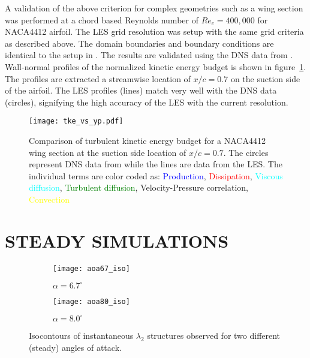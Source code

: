 \documentclass[twocolumn,10pt]{tsfp}
\begin{document}
A validation of the above criterion for complex geometries such as a wing section was performed at a chord based Reynolds number of $Re_{c}=400,000$ for NACA4412 airfoil. The LES grid resolution was setup with the same grid criteria as described above. The domain boundaries and boundary conditions are identical to the setup in \cite{hosseini16}. The results are validated using the DNS data from \cite{hosseini16}. Wall-normal profiles of the normalized kinetic energy budget is shown in figure~\ref{fig:wing_budget}. The profiles are extracted a streamwise location of $x/c=0.7$ on the suction side of the airfoil. The LES profiles (lines) match very well with the DNS data (circles), signifying the high accuracy of the LES with the current resolution.
\begin{figure}[h]
	\centering
	\texttt{[image: tke\_vs\_yp.pdf]}
	\caption{Comparison of turbulent kinetic energy budget for a NACA4412 wing section at the suction side location of $x/c=0.7$. The circles represent DNS data from \cite{hosseini16} while the lines are data from the LES. The individual terms are color coded as: \textcolor{blue}{Production}, \textcolor{red}{Dissipation}, \textcolor{cyan}{Viscous diffusion}, \textcolor{green}{Turbulent diffusion}, \textcolor{mygray}{Velocity-Pressure correlation}, \textcolor{yellow}{Convection}}
	\label{fig:wing_budget}
\end{figure}
\section*{STEADY SIMULATIONS}
\begin{figure*}[t]
	\centering
	\begin{subfigure}[b]{0.45\textwidth}
		\centering
		\texttt{[image: aoa67\_iso]}
		\caption{$\alpha=6.7^{\circ}$}
		\label{fig:aoa67_iso}
	\end{subfigure}
	\begin{subfigure}[b]{0.45\textwidth}
		\centering
		\texttt{[image: aoa80\_iso]}
		\caption{$\alpha=8.0^{\circ}$}
		\label{fig:aoa80_iso}
	\end{subfigure}
	\caption{Isocontours of instantaneous $\lambda_{2}$ structures observed for two different (steady) angles of attack.}
	\label{fig:isocontour_aoa}
\end{figure*}
\end{document}
